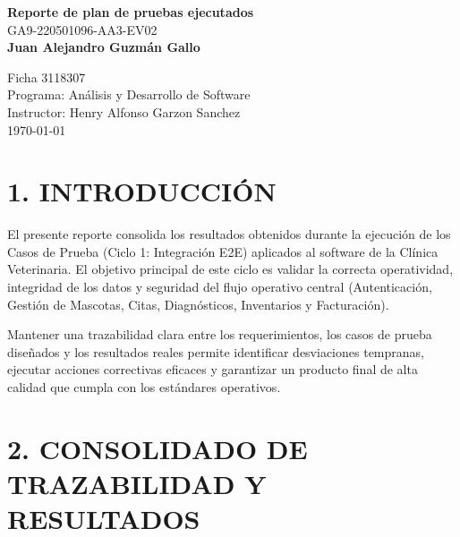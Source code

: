 \documentclass[11pt,a4paper]{article}
\begin{document}
\begin{titlepage}
\thispagestyle{empty} 
\centering
\vspace*{3cm}

{\Huge \textbf{Reporte de plan de pruebas ejecutados}}\\[1.5cm]

{\Large GA9-220501096-AA3-EV02}\\[3cm]

{\Large \textbf{Juan Alejandro Guzmán Gallo}}\\[3cm]

\vfill

{\Large Ficha 3118307}\\[0.5cm]
{\Large Programa: Análisis y Desarrollo de Software}\\[0.5cm]
{\Large Instructor: Henry Alfonso Garzon Sanchez}\\[0.5cm]
{\Large \today}\\[1cm]

\end{titlepage}

\newpage

\section*{1. INTRODUCCIÓN}
El presente reporte consolida los resultados obtenidos durante la ejecución de los Casos de Prueba (Ciclo 1: Integración E2E) aplicados al software de la Clínica Veterinaria. El objetivo principal de este ciclo es validar la correcta operatividad, integridad de los datos y seguridad del flujo operativo central (Autenticación, Gestión de Mascotas, Citas, Diagnósticos, Inventarios y Facturación). 

Mantener una trazabilidad clara entre los requerimientos, los casos de prueba diseñados y los resultados reales permite identificar desviaciones tempranas, ejecutar acciones correctivas eficaces y garantizar un producto final de alta calidad que cumpla con los estándares operativos.

\section*{2. CONSOLIDADO DE TRAZABILIDAD Y RESULTADOS}
\end{document}
